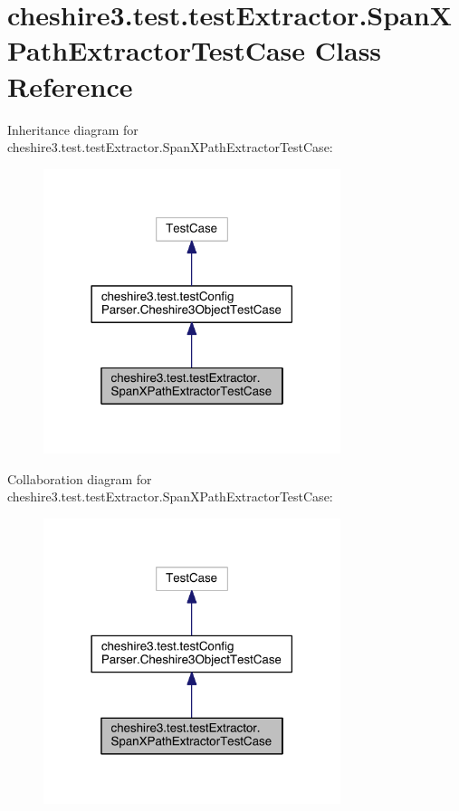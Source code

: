 \hypertarget{classcheshire3_1_1test_1_1test_extractor_1_1_span_x_path_extractor_test_case}{\section{cheshire3.\-test.\-test\-Extractor.\-Span\-X\-Path\-Extractor\-Test\-Case Class Reference}
\label{classcheshire3_1_1test_1_1test_extractor_1_1_span_x_path_extractor_test_case}
}


Inheritance diagram for cheshire3.\-test.\-test\-Extractor.\-Span\-X\-Path\-Extractor\-Test\-Case\-:
\nopagebreak
\begin{figure}[H]
\begin{center}
\leavevmode
\includegraphics[width=246pt]{classcheshire3_1_1test_1_1test_extractor_1_1_span_x_path_extractor_test_case__inherit__graph}
\end{center}
\end{figure}


Collaboration diagram for cheshire3.\-test.\-test\-Extractor.\-Span\-X\-Path\-Extractor\-Test\-Case\-:
\nopagebreak
\begin{figure}[H]
\begin{center}
\leavevmode
\includegraphics[width=246pt]{classcheshire3_1_1test_1_1test_extractor_1_1_span_x_path_extractor_test_case__coll__graph}
\end{center}
\end{figure}
